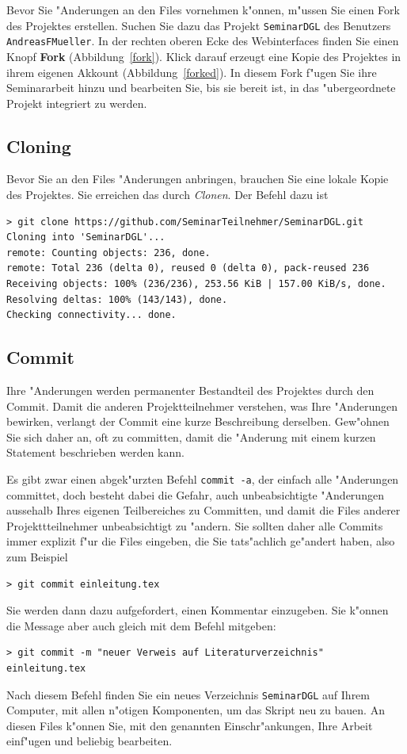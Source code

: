 \documentclass[a4paper,12pt]{article}
\begin{document}
Bevor Sie "Anderungen an den Files vornehmen k"onnen, m"ussen Sie
einen Fork des Projektes erstellen.
Suchen Sie dazu das Projekt \texttt{SeminarDGL} des Benutzers
\texttt{AndreasFMueller}.
In der rechten oberen Ecke des Webinterfaces finden Sie einen Knopf
\textbf{Fork} (Abbildung~\ref{fork}).
Klick darauf erzeugt eine Kopie des Projektes in ihrem eigenen Akkount
(Abbildung~\ref{forked}).
In diesem Fork f"ugen Sie ihre Seminararbeit hinzu und bearbeiten
Sie, bis sie bereit ist, in das "ubergeordnete Projekt integriert
zu werden.

\subsection{Cloning}
Bevor Sie an den Files "Anderungen anbringen, brauchen Sie eine 
lokale Kopie des Projektes.
Sie erreichen das durch {\em Clonen}.
Der Befehl dazu ist
\begin{verbatim}
> git clone https://github.com/SeminarTeilnehmer/SeminarDGL.git
Cloning into 'SeminarDGL'...
remote: Counting objects: 236, done.
remote: Total 236 (delta 0), reused 0 (delta 0), pack-reused 236
Receiving objects: 100% (236/236), 253.56 KiB | 157.00 KiB/s, done.
Resolving deltas: 100% (143/143), done.
Checking connectivity... done.
\end{verbatim}


\subsection{Commit}
Ihre "Anderungen werden permanenter Bestandteil des Projektes durch 
den Commit.
Damit die anderen Projektteilnehmer verstehen, was Ihre "Anderungen
bewirken, verlangt der Commit eine kurze Beschreibung derselben.
Gew"ohnen Sie sich daher an, oft zu committen, damit die "Anderung
mit einem kurzen Statement beschrieben werden kann.

Es gibt zwar einen abgek"urzten Befehl \texttt{commit -a}, der einfach
alle "Anderungen committet, doch besteht dabei die Gefahr, auch
unbeabsichtigte "Anderungen aussehalb Ihres eigenen Teilbereiches zu 
Committen, und damit die Files anderer Projekttteilnehmer unbeabsichtigt
zu "andern.
Sie sollten daher alle Commits immer explizit f"ur die Files eingeben,
die Sie tats"achlich ge"andert haben, also zum Beispiel
\begin{verbatim}
> git commit einleitung.tex
\end{verbatim}
Sie werden dann dazu aufgefordert, einen Kommentar einzugeben. 
Sie k"onnen die Message aber auch gleich mit dem Befehl mitgeben:
\begin{verbatim}
> git commit -m "neuer Verweis auf Literaturverzeichnis" einleitung.tex
\end{verbatim}
Nach diesem Befehl finden Sie ein neues Verzeichnis \texttt{SeminarDGL}
auf Ihrem Computer, mit allen n"otigen Komponenten, um das Skript
neu zu bauen.
An diesen Files k"onnen Sie, mit den genannten Einschr"ankungen,
Ihre Arbeit einf"ugen und beliebig bearbeiten.
\end{document}
